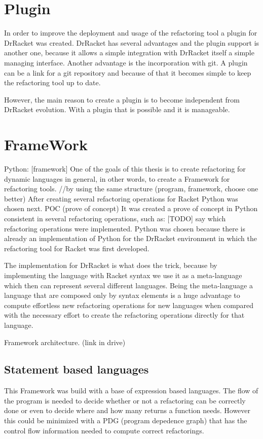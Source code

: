 
\section{Plugin}
In order to improve the deployment and usage of the refactoring tool a plugin
for DrRacket was created.
DrRacket has several advantages and the plugin support is another one, because
it allows a simple integration with DrRacket itself a simple managing interface.
Another advantage is the incorporation with git. A plugin can be a link for a git
repository and because of that it becomes simple to keep the refactoring tool up to date.

However, the main reason to create a plugin is to become independent from DrRacket
evolution. With a plugin that is possible and it is manageable.
\section{FrameWork}
Python: [framework]
One of the goals of this thesis is to create refactoring for dynamic languages in general,
in other words, to create a Framework for refactoring tools.
//by using the same structure (program, framework, choose one better)
After creating several refactoring operations for Racket Python was chosen next.
POC (prove of concept)
It was created a prove of concept in Python consistent in several refactoring operations, such as:
[TODO] say which refactoring operations were implemented.
Python was chosen because there is already an implementation of Python for the
 DrRacket environment in which the refactoring tool for Racket was first developed.


 The implementation for DrRacket is what does the trick, because by implementing
 the language with Racket syntax we use it as a meta-language which then
 can represent several different languages. Being the meta-language a language that are
 composed only by syntax elements is a huge advantage to compute effortless new
 refactoring operations for new languages when compared with the necessary effort to create
 the refactoring operations directly for that language.

 Framework architecture.
(link in drive)


\subsection{Statement based languages}
This Framework was build with a base of expression based languages. The flow of
the program is needed to decide whether or not a refactoring can be correctly done
or even to decide where and how many returns a function needs. However this could
be minimized with a PDG (program depedence graph) that has the control flow information
needed to compute correct refactorings.

